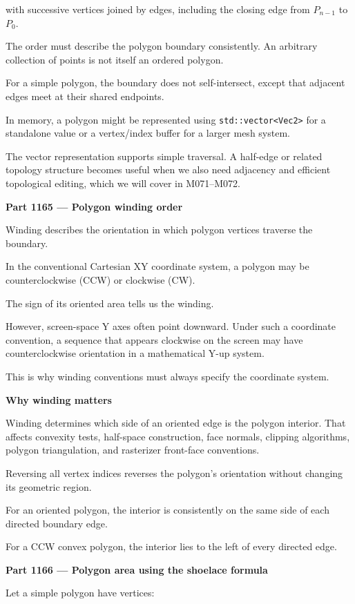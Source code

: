 with successive vertices joined by edges, including the closing edge from \(P_{n-1}\) to \(P_0\).

The order must describe the polygon boundary consistently. An arbitrary collection of points is not itself an ordered polygon.

For a simple polygon, the boundary does not self-intersect, except that adjacent edges meet at their shared endpoints.

In memory, a polygon might be represented using \texttt{std::vector\textless{}Vec2\textgreater{}} for a standalone value or a vertex/index buffer for a larger mesh system.

The vector representation supports simple traversal. A half-edge or related topology structure becomes useful when we also need adjacency and efficient topological editing, which we will cover in M071--M072.

\textbf{Part 1165 --- Polygon winding order}

Winding describes the orientation in which polygon vertices traverse the boundary.

In the conventional Cartesian XY coordinate system, a polygon may be counterclockwise (CCW) or clockwise (CW).

The sign of its oriented area tells us the winding.

However, screen-space Y axes often point downward. Under such a coordinate convention, a sequence that appears clockwise on the screen may have counterclockwise orientation in a mathematical Y-up system.

This is why winding conventions must always specify the coordinate system.

\textbf{Why winding matters}

Winding determines which side of an oriented edge is the polygon interior. That affects convexity tests, half-space construction, face normals, clipping algorithms, polygon triangulation, and rasterizer front-face conventions.

Reversing all vertex indices reverses the polygon's orientation without changing its geometric region.

For an oriented polygon, the interior is consistently on the same side of each directed boundary edge.

For a CCW convex polygon, the interior lies to the left of every directed edge.

\textbf{Part 1166 --- Polygon area using the shoelace formula}

Let a simple polygon have vertices:


